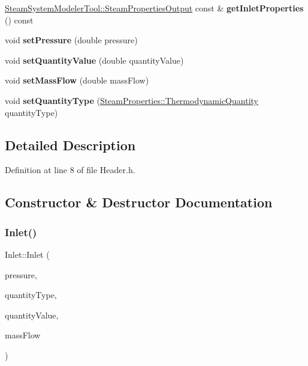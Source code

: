 \begin{DoxyCompactItemize}
\hyperlink{struct_steam_system_modeler_tool_1_1_steam_properties_output}{Steam\+System\+Modeler\+Tool\+::\+Steam\+Properties\+Output} const  \& {\bfseries get\+Inlet\+Properties} () const
\item 
\mbox{\label{class_inlet_ad0d848976347160293c6576e005f090b}} 
void {\bfseries set\+Pressure} (double pressure)
\item 
\mbox{\label{class_inlet_a64a5567c35c89f82f5782bf7b83b90c3}} 
void {\bfseries set\+Quantity\+Value} (double quantity\+Value)
\item 
\mbox{\label{class_inlet_a1e427ac34eeebf46546ed53499359459}} 
void {\bfseries set\+Mass\+Flow} (double mass\+Flow)
\item 
\mbox{\label{class_inlet_a4171632101de3f4c97c93bb06c6b51e4}} 
void {\bfseries set\+Quantity\+Type} (\hyperlink{class_steam_properties_ae0294bedf7d178c2d8fb6aed0f62fbff}{Steam\+Properties\+::\+Thermodynamic\+Quantity} quantity\+Type)
\end{DoxyCompactItemize}


\subsection{Detailed Description}


Definition at line 8 of file Header.\+h.



\subsection{Constructor \& Destructor Documentation}
\mbox{\label{class_inlet_a1b0e1d27b8c7b11cfd96623b1c0b8a9e}} 
\subsubsection{\texorpdfstring{Inlet()}{Inlet()}\hspace{0.1cm}{\footnotesize\ttfamily [1/3]}}
{\footnotesize\ttfamily Inlet\+::\+Inlet (\begin{DoxyParamCaption}\item[{double}]{pressure,  }\item[{\hyperlink{class_steam_properties_ae0294bedf7d178c2d8fb6aed0f62fbff}{Steam\+Properties\+::\+Thermodynamic\+Quantity}}]{quantity\+Type,  }\item[{double}]{quantity\+Value,  }\item[{double}]{mass\+Flow }\end{DoxyParamCaption})}

